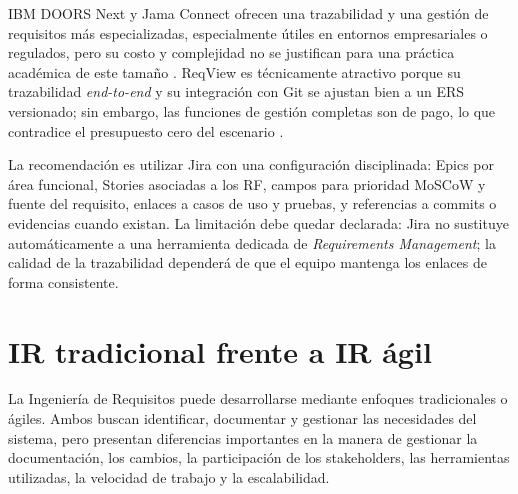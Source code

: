 \documentclass[journal,onecolumn]{IEEEtran}
\begin{document}
	IBM DOORS Next y Jama Connect ofrecen una trazabilidad y una gestión de requisitos más
	especializadas, especialmente útiles en entornos empresariales o regulados, pero su costo y
	complejidad no se justifican para una práctica académica de este tamaño \cite{ibmdoors2026,
		jama2026}. ReqView es técnicamente atractivo porque su trazabilidad \emph{end-to-end} y su
	integración con Git se ajustan bien a un ERS versionado; sin embargo, las funciones de gestión
	completas son de pago, lo que contradice el presupuesto cero del escenario \cite{reqview2026}.
	
	La recomendación es utilizar Jira con una configuración disciplinada: Epics por área funcional,
	Stories asociadas a los RF, campos para prioridad MoSCoW y fuente del requisito, enlaces a casos
	de uso y pruebas, y referencias a commits o evidencias cuando existan. La limitación debe quedar
	declarada: Jira no sustituye automáticamente a una herramienta dedicada de \emph{Requirements
		Management}; la calidad de la trazabilidad dependerá de que el equipo mantenga los enlaces de
	forma consistente.
	\newpage
	\section{IR tradicional frente a IR ágil}
	\label{sec:tradicional-agil}
	
	La Ingeniería de Requisitos puede desarrollarse mediante enfoques tradicionales o ágiles. Ambos
	buscan identificar, documentar y gestionar las necesidades del sistema, pero presentan diferencias
	importantes en la manera de gestionar la documentación, los cambios, la participación de los
	stakeholders, las herramientas utilizadas, la velocidad de trabajo y la escalabilidad.
	
\end{document}
